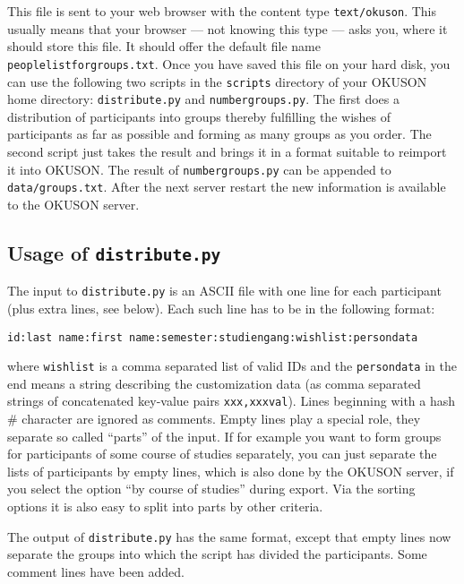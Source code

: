 \documentclass[12pt,openany,a4paper]{book}
\newcommand{\OKUSON}{\textsf{OKUSON}}
\begin{document}
This file is sent to your web browser with the content type 
\texttt{text/okuson}. This usually means that your browser --- not
knowing this type --- asks you, where it should store this file. It should
offer the default file name \texttt{peoplelistforgroups.txt}. Once you have
saved this file on your hard disk, you can use the following two scripts
in the \texttt{scripts} directory of your {\OKUSON} home directory:
\texttt{distribute.py} and \texttt{numbergroups.py}. The first
does a distribution of participants into groups thereby
fulfilling the wishes of participants as far as possible and forming as
many groups as you order. The second script just takes the result and
brings it in a format suitable to reimport it into {\OKUSON}. The 
result of \texttt{numbergroups.py} can be appended to 
\texttt{data/groups.txt}. After the next server restart the new
information is available to the {\OKUSON} server.

\subsection{Usage of \texttt{distribute.py}}

\label{distribute.py}

The input to \texttt{distribute.py} is an ASCII file with one line for
each participant (plus extra lines, see below). Each such line has to
be in the following format:

{\small
\hspace*{5mm}\texttt{id:last name:first
name:semester:studiengang:wishlist:persondata}
}

where \texttt{wishlist} is a comma separated list of valid IDs and the
\texttt{persondata} in the end means a string describing the customization 
data (as comma separated strings of concatenated key-value pairs 
\texttt{xxx,xxxval}). Lines
beginning with a hash \# character are ignored as comments. Empty lines
play a special role,  they separate so called ``parts'' of the
input. If for example you want to form groups for participants
of some course of studies separately, you can just separate the lists of
participants by empty lines, which is also done by the {\OKUSON} server,
if you select the option ``by course of studies'' during export. Via the
sorting options it is also easy to split into parts by other criteria.

The output of \texttt{distribute.py} has the same format, except that
empty lines now separate the groups into which the script has divided the
participants. Some comment lines have been added.
\end{document}
